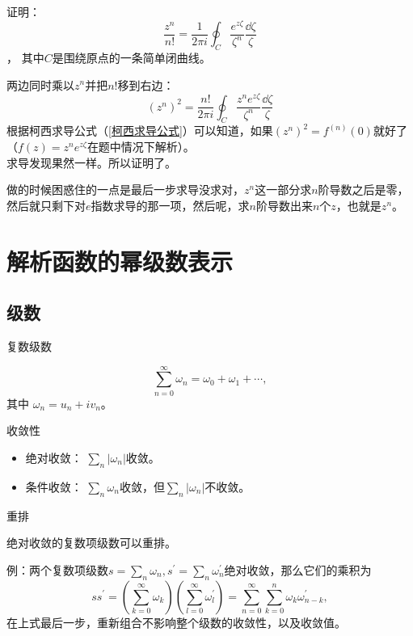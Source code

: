 \documentclass[cn,hazy,blue,14pt,normal]{elegantnote}
\numberwithin{equation}{section}
\begin{document}
\begin{example}
	证明：
	$$ \frac{z^n}{n!} = \frac{1}{2\pi i}\oint_C \frac{e^{z\zeta}}{\zeta^n}\frac{\dd \zeta}{\zeta} $$，
	其中$C$是围绕原点的一条简单闭曲线。
\end{example}
两边同时乘以$z^n$并把$n!$移到右边：
$$ \left(z^n\right)^2 = \frac{n!}{2\pi i}\oint_C \frac{z^n e^{ z\zeta}}{\zeta^n}\frac{\dd \zeta}{\zeta} $$
根据柯西求导公式（\ref{柯西求导公式}）可以知道，如果$\left(z^n\right)^2 = f^{(n)}(0)$就好了（$ f(z) = z^n e^{ z\zeta} $在题中情况下解析）。\\
求导发现果然一样。所以证明了。
\begin{note}
	做的时候困惑住的一点是最后一步求导没求对，$z^n$这一部分求$n$阶导数之后是零，然后就只剩下对$e$指数求导的那一项，然后呢，求$n$阶导数出来$n$个$z$，也就是$z^n$。
\end{note}

\newpage
\section{解析函数的幂级数表示}
\newpage

\subsection{级数}

\begin{definition}
	复数级数
\end{definition}
$$
\sum^\infty_{n=0} \omega_n = \omega_0 + \omega_1 + \cdots,
$$
其中 $\omega_n = u_n + i v_n$。

\begin{definition}
	收敛性
\end{definition}
\begin{itemize}
	\item 绝对收敛： $\sum_n |\omega_n| $收敛。
	\item 条件收敛： $\sum_n \omega_n $收敛，但$\sum_n |\omega_n| $不收敛。
\end{itemize}

\begin{theorem}
	重排
\end{theorem}
绝对收敛的复数项级数可以重排。

例：两个复数项级数$s=\sum_n \omega_n, s^\prime=\sum_n \omega^\prime_n$绝对收敛，那么它们的乘积为
$$
s s^\prime = (\sum^\infty_{k=0} \omega_k) ( \sum^\infty_{l=0} \omega^\prime_l) = \sum^\infty_{n=0} \sum^n_{k=0} \omega_k \omega^\prime_{n-k},
$$
在上式最后一步，重新组合不影响整个级数的收敛性，以及收敛值。
\end{document}
